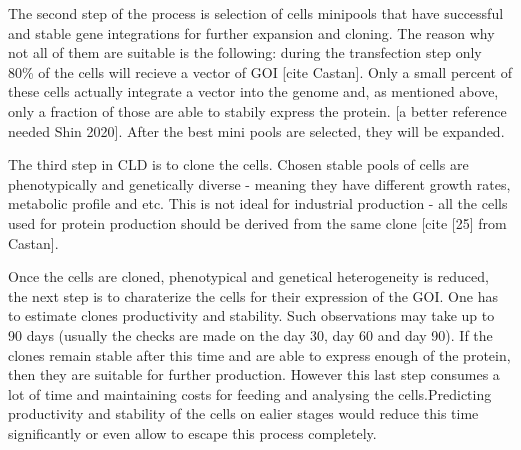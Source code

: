 The second step of the process is selection of cells minipools that have successful and stable gene integrations for further expansion and cloning. The reason why not all of them are suitable is the following: during the transfection step only 80\% of the cells will recieve a vector of GOI [cite Castan]. Only a small percent of these cells actually integrate a vector into the genome and, as mentioned above, only a fraction of those are able to stabily express the protein. [a better reference needed Shin 2020]. After the best mini pools are selected, they will be expanded.

The third step in CLD is to clone the cells. Chosen stable pools of cells are phenotypically and genetically diverse - meaning they have different growth rates, metabolic profile and etc. This is not ideal for industrial production - all the cells used for protein production should be derived from the same clone [cite [25] from Castan]. 

Once the cells are cloned, phenotypical and genetical heterogeneity is reduced, the next step is to charaterize the cells for their expression of the GOI. One has to estimate clones productivity and stability. Such observations may take up to 90 days (usually the checks are made on the day 30, day 60 and day 90). If the clones remain stable after this time and are able to express enough of the protein, then they are suitable for further production. However this last step consumes a lot of time and maintaining costs for feeding and analysing the cells.Predicting productivity and stability of the cells on ealier stages would reduce this time significantly or even allow to escape this process completely. 